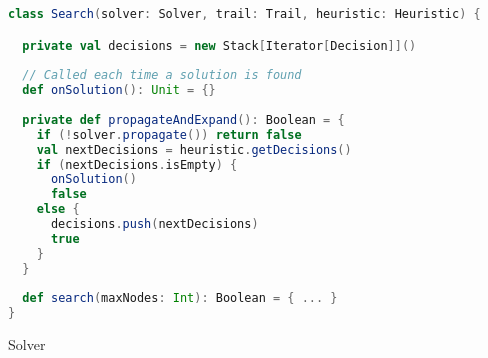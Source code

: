 \documentclass{llncs}
\begin{document}
\begin{code}
\begin{lstlisting}[language=scala, style=lineNumber]
class Search(solver: Solver, trail: Trail, heuristic: Heuristic) {

  private val decisions = new Stack[Iterator[Decision]]()
  
  // Called each time a solution is found
  def onSolution(): Unit = {}
  
  private def propagateAndExpand(): Boolean = {
    if (!solver.propagate()) return false
    val nextDecisions = heuristic.getDecisions()
    if (nextDecisions.isEmpty) {
      onSolution()
      false
    else {
      decisions.push(nextDecisions)
      true
    }
  }
  
  def search(maxNodes: Int): Boolean = { ... }
}
\end{lstlisting}
\caption{Solver}
\label{code:dfs1}
\end{code}
\end{document}
